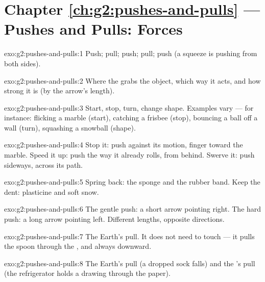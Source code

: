 \section*{Chapter \ref{ch:g2:pushes-and-pulls} --- Pushes and Pulls: Forces}

\begin{solution}{exo:g2:pushes-and-pulls:1}
Push; pull; push; pull; push (a squeeze is pushing from both sides).
\end{solution}

\begin{solution}{exo:g2:pushes-and-pulls:2}
Where the  grabs the object, which way it acts, and how strong
it is (by the arrow's length).
\end{solution}

\begin{solution}{exo:g2:pushes-and-pulls:3}
Start, stop, turn, change shape. Examples vary --- for instance:
flicking a marble (start), catching a frisbee (stop), bouncing a
ball off a wall (turn), squashing a snowball (shape).
\end{solution}

\begin{solution}{exo:g2:pushes-and-pulls:4}
Stop it: push against its motion, finger toward the marble. Speed it
up: push the way it already rolls, from behind. Swerve it: push
sideways, across its path.
\end{solution}

\begin{solution}{exo:g2:pushes-and-pulls:5}
Spring back: the sponge and the rubber band. Keep the dent:
plasticine and soft snow.
\end{solution}

\begin{solution}{exo:g2:pushes-and-pulls:6}
The gentle push: a short arrow pointing right. The hard push: a long
arrow pointing left. Different lengths, opposite directions.
\end{solution}

\begin{solution}{exo:g2:pushes-and-pulls:7}
The Earth's pull. It does not need to touch --- it pulls the spoon
through the , and always downward.
\end{solution}

\begin{solution}{exo:g2:pushes-and-pulls:8}
The Earth's pull (a dropped sock falls) and the 's pull (the
refrigerator  holds a drawing through the paper).
\end{solution}

